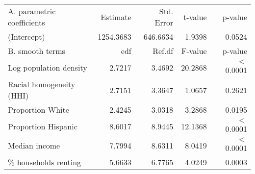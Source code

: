 \begin{table}[ht]
\centering
\begin{tabular}{lrrrr}
   \hline
A. parametric coefficients & Estimate & Std. Error & t-value & p-value \\ 
  (Intercept) & 1254.3683 & 646.6634 & 1.9398 & 0.0524 \\ 
   \hline
B. smooth terms & edf & Ref.df & F-value & p-value \\ 
  Log population density & 2.7217 & 3.4692 & 20.2868 & $<$ 0.0001 \\ 
  Racial homogeneity (HHI) & 2.7151 & 3.3647 & 1.0657 & 0.2621 \\ 
  Proportion White & 2.4245 & 3.0318 & 3.2868 & 0.0195 \\ 
  Proportion Hispanic & 8.6017 & 8.9445 & 12.1368 & $<$ 0.0001 \\ 
  Median income & 7.7994 & 8.6311 & 8.0419 & $<$ 0.0001 \\ 
  \% households renting & 5.6633 & 6.7765 & 4.0249 & 0.0003 \\ 
   \hline
\end{tabular}
\caption{ } 
\label{Demographic GAM}
\end{table}
